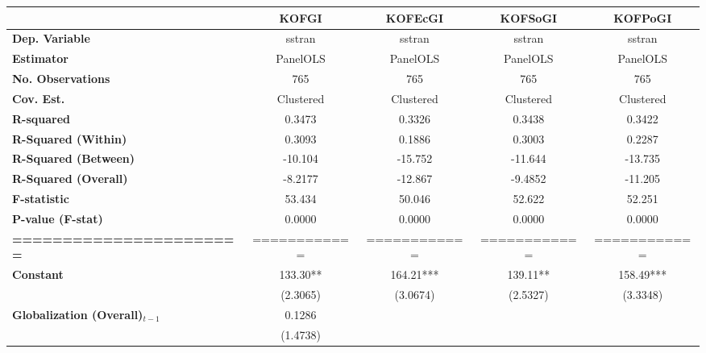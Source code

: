 \begin{center}
\begin{tabular}{lcccc}
\toprule
                                   & \textbf{KOFGI} & \textbf{KOFEcGI} & \textbf{KOFSoGI} & \textbf{KOFPoGI}  \\
\midrule
\textbf{Dep. Variable}             &     sstran     &      sstran      &      sstran      &      sstran       \\
\textbf{Estimator}                 &    PanelOLS    &     PanelOLS     &     PanelOLS     &     PanelOLS      \\
\textbf{No. Observations}          &      765       &       765        &       765        &       765         \\
\textbf{Cov. Est.}                 &   Clustered    &    Clustered     &    Clustered     &    Clustered      \\
\textbf{R-squared}                 &     0.3473     &      0.3326      &      0.3438      &      0.3422       \\
\textbf{R-Squared (Within)}        &     0.3093     &      0.1886      &      0.3003      &      0.2287       \\
\textbf{R-Squared (Between)}       &    -10.104     &     -15.752      &     -11.644      &     -13.735       \\
\textbf{R-Squared (Overall)}       &    -8.2177     &     -12.867      &     -9.4852      &     -11.205       \\
\textbf{F-statistic}               &     53.434     &      50.046      &      52.622      &      52.251       \\
\textbf{P-value (F-stat)}          &     0.0000     &      0.0000      &      0.0000      &      0.0000       \\
\textbf{=======================}   &  ============  &   ============   &   ============   &   ============    \\
\textbf{Constant}                     &    133.30**    &    164.21***     &     139.11**     &    158.49***      \\
\textbf{ }                         &    (2.3065)    &     (3.0674)     &     (2.5327)     &     (3.3348)      \\
\textbf{Globalization (Overall)$_{t-1}$}               &     0.1286     &                  &                  &                   \\
\textbf{ }                         &    (1.4738)    &                  &                  &                   \\

\end{tabular}
\end{center}
